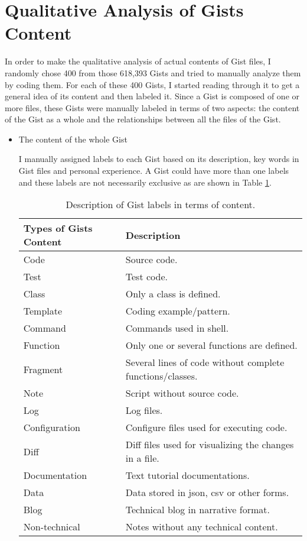 \section{Qualitative Analysis of Gists Content}

In order to make the qualitative analysis of actual contents of Gist files, I randomly chose 400 from those 618,393 Gists and tried to manually analyze them by coding them. For each of these 400 Gists, I started reading through it to get a general idea of its content and then labeled it. Since a Gist is composed of one or more files, these Gists were manually labeled in terms of two aspects: the content of the Gist as a whole and the relationships between all the files of the Gist.  

\begin{itemize}

  \item The content of the whole Gist

  I manually assigned labels to each Gist based on its description, key words in Gist files and personal experience. A Gist could have more than one labels and these labels are not necessarily exclusive as are shown in Table \ref{tb:gistcontentlabels}.

\begin{table}[!htb]
 \begin{center}
 \begin{tabular}{ll} 
   \textbf{Types of Gists Content}	&	\textbf{Description}\\ \hline
   Code & Source code.\\
   Test & Test code.\\ 
   Class & Only a class is defined.\\ 
   Template & Coding example/pattern.\\ 
   Command & Commands used in shell.\\ 
   Function & Only one or several functions are defined.\\ 
   Fragment & Several lines of code without complete functions/classes.\\
   Note & Script without source code.\\ 
   Log & Log files.\\ 
   Configuration & Configure files used for executing code.\\ 
   Diff & Diff files used for visualizing the changes in a file.\\ 
   Documentation & Text tutorial documentations.\\ 
   Data & Data stored in json, csv or other forms.\\ 
   Blog & Technical blog in narrative format.\\ 
   Non-technical & Notes without any technical content.\\ \hline
 \end{tabular}
 \end{center}
 \caption{Description of Gist labels in terms of content.}
 \label{tb:gistcontentlabels}
\end{table}


\end{itemize}
